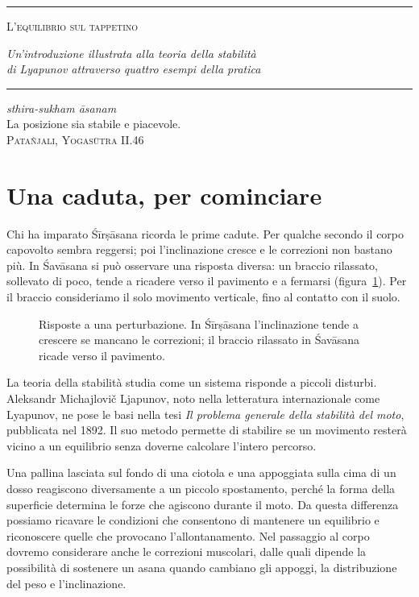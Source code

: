 \documentclass[11pt]{article}
\newcommand{\spacedallcaps}[1]{\textsc{#1}}
\newcommand{\spacedlowsmallcaps}[1]{\textsc{#1}}
\newcommand{\pittSirsasana}[1][]{%
  \begin{scope}[#1]
    \fill[testa] (0,0.14) circle (0.14);
    \draw[corpo] (0,0.31) -- (0,1.02) -- (0,1.92);
    \draw[corpo] (0,0.42) -- (0.42,0.035) -- (0.12,0.035);
  \end{scope}}
\newcommand{\pittSavasanaArto}[2][]{%
  \begin{scope}[#1]
    \fill[testa] (0,0.15) circle (0.14);
    \draw[corpo] (0.17,0.08) -- (0.85,0.08) -- (1.72,0.06) -- (1.80,0.21);
    \draw[corpo] (0.27,0.10) -- ++(#2:0.60);
  \end{scope}}
\newcommand{\frontespizio}{%
  \thispagestyle{empty}%
  \begin{center}
    {\color{Maroon}\rule{\textwidth}{0.4pt}}\par\vspace{1.4em}
    {\LARGE\spacedallcaps{L'equilibrio sul tappetino}}\par\vspace{0.9em}
    {\large\itshape Un'introduzione illustrata alla teoria della stabilità\\di Lyapunov attraverso quattro esempi della pratica}\par\vspace{1.3em}
    {\color{Maroon}\rule{\textwidth}{0.4pt}}
  \end{center}
  \vspace{1.0em}
  \begin{flushright}\small
    \textit{sthira-sukham āsanam}\\[2pt]
    La posizione sia stabile e piacevole.\\[2pt]
    {\color{halfgray}\spacedlowsmallcaps{Patañjali, Yogasūtra II.46}}
  \end{flushright}
  \vspace{1.2em}}
\begin{document}
\frontespizio

\section*{Una caduta, per cominciare}

Chi ha imparato Śīrṣāsana ricorda le prime cadute. Per qualche secondo il corpo capovolto sembra reggersi; poi l'inclinazione cresce e le correzioni non bastano più. In Śavāsana si può osservare una risposta diversa: un braccio rilassato, sollevato di poco, tende a ricadere verso il pavimento e a fermarsi (figura~\ref{fig:apertura}). Per il braccio consideriamo il solo movimento verticale, fino al contatto con il suolo.

\begin{figure}[htbp]
\centering
{}
\caption{Risposte a una perturbazione. In Śīrṣāsana l'inclinazione tende a crescere se mancano le correzioni; il braccio rilassato in Śavāsana ricade verso il pavimento.}
\label{fig:apertura}
\end{figure}

La teoria della stabilità studia come un sistema risponde a piccoli disturbi. Aleksandr Michajlovič Ljapunov, noto nella letteratura internazionale come Lyapunov, ne pose le basi nella tesi \emph{Il problema generale della stabilità del moto}, pubblicata nel 1892. Il suo metodo permette di stabilire se un movimento resterà vicino a un equilibrio senza doverne calcolare l'intero percorso.

Una pallina lasciata sul fondo di una ciotola e una appoggiata sulla cima di un dosso reagiscono diversamente a un piccolo spostamento, perché la forma della superficie determina le forze che agiscono durante il moto. Da questa differenza possiamo ricavare le condizioni che consentono di mantenere un equilibrio e riconoscere quelle che provocano l'allontanamento. Nel passaggio al corpo dovremo considerare anche le correzioni muscolari, dalle quali dipende la possibilità di sostenere un asana quando cambiano gli appoggi, la distribuzione del peso e l'inclinazione.
\end{document}
